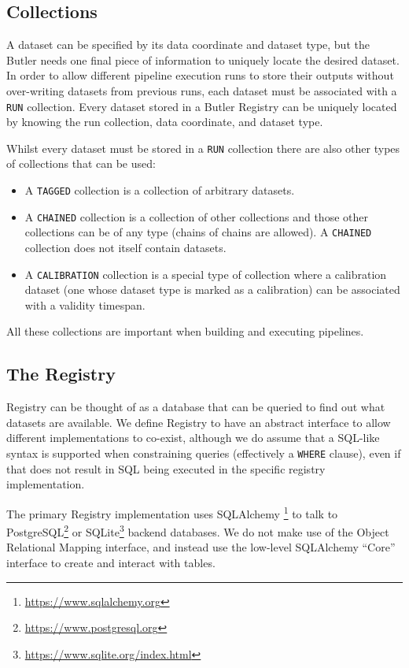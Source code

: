 \documentclass[]{spie}
\begin{document}
\subsection{Collections}

A dataset can be specified by its data coordinate and dataset type, but the Butler needs one final piece of information to uniquely locate the desired dataset.
In order to allow different pipeline execution runs to store their outputs without over-writing datasets from previous runs, each dataset must be associated with a \texttt{RUN} collection.
Every dataset stored in a Butler Registry can be uniquely located by knowing the run collection, data coordinate, and dataset type.

Whilst every dataset must be stored in a \texttt{RUN} collection there are also other types of collections that can be used:

\begin{itemize}
\item A \texttt{TAGGED} collection is a collection of arbitrary datasets.
\item A \texttt{CHAINED} collection is a collection of other collections and those other collections can be of any type (chains of chains are allowed).
      A \texttt{CHAINED} collection does not itself contain datasets.
\item A \texttt{CALIBRATION} collection is a special type of collection where a calibration dataset (one whose dataset type is marked as a calibration) can be associated with a validity timespan.
\end{itemize}

All these collections are important when building and executing pipelines.

\subsection{The Registry}

Registry can be thought of as a database that can be queried to find out what datasets are available.
We define Registry to have an abstract interface to allow different implementations to co-exist, although we do assume that a SQL-like syntax is supported when constraining queries (effectively a \texttt{WHERE} clause), even if that does not result in SQL being executed in the specific registry implementation.

The primary Registry implementation uses SQLAlchemy \cite{myers2015essential}\footnote{\url{https://www.sqlalchemy.org}} to talk to PostgreSQL\footnote{\url{https://www.postgresql.org}} or SQLite\footnote{\url{https://www.sqlite.org/index.html}} backend databases.
We do not make use of the Object Relational Mapping interface, and instead use the low-level SQLAlchemy ``Core'' interface to create and interact with tables.
\end{document}

